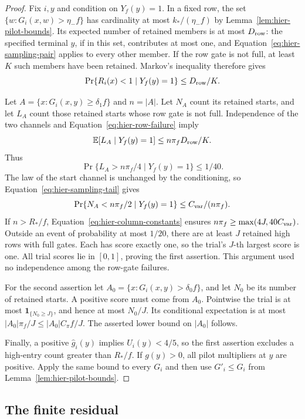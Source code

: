 \begin{proof}
Fix $i,y$ and condition on $Y_f(y)=1$.  In a fixed row, the set
$\{w:G_i(x,w)>\eta_-f\}$ has cardinality at most
$k_*/(\eta_-f)$ by Lemma~\ref{lem:hier-pilot-bounds}.
Its expected number of retained members is at most $D_{\rm row}$:
the specified terminal $y$, if in this set, contributes at most one,
and Equation~\eqref{eq:hier-sampling-pair} applies to every other member.
If the row gate is not full, at least $K$ such members have been retained.
Markov's inequality therefore gives
\begin{equation}
 \Pr\{R_i(x)<1\mid Y_f(y)=1\}\leq D_{\rm row}/K.
 \label{eq:hier-row-failure}
\end{equation}

Let $A=\{x:G_i(x,y)\geq\delta_1f\}$ and $n=|A|$.
Let $N_A$ count its retained starts, and let $L_A$ count those retained
starts whose row gate is not full.  Independence of the two channels
and Equation~\eqref{eq:hier-row-failure} imply
\[
 \mathbb E[L_A\mid Y_f(y)=1]\leq n\pi_fD_{\rm row}/K.
\]
Thus
\[
 \Pr\{L_A>n\pi_f/4\mid Y_f(y)=1\}\leq1/40.
\]
The law of the start channel is unchanged by the conditioning, so
Equation~\eqref{eq:hier-sampling-tail} gives
\[
 \Pr\{N_A<n\pi_f/2\mid Y_f(y)=1\}
       \leq C_{\rm var}/(n\pi_f).
\]
If $n>R_*/f$, Equation~\eqref{eq:hier-column-constants} ensures
$n\pi_f\geq\max(4J,40C_{\rm var})$.  Outside an event of probability
at most $1/20$, there are at least $J$ retained high rows with full
gates.  Each has score exactly one, so the trial's $J$-th largest score
is one.  All trial scores lie in $[0,1]$, proving the first assertion.
This argument used no independence among the row-gate failures.

For the second assertion let
$A_0=\{x:G_i(x,y)>\delta_0f\}$, and let $N_0$ be its number of
retained starts.  A positive score must come from $A_0$.  Pointwise the
trial is at most $\mathbf 1_{\{N_0\geq J\}}$, and hence at most
$N_0/J$.  Its conditional expectation is at most
$|A_0|\pi_f/J\leq |A_0|C_\pi f/J$.  The asserted lower bound on
$|A_0|$ follows.

Finally, a positive $\widehat g_i(y)$ implies $U_i(y)<4/5$, so the
first assertion excludes a high-entry count greater than $R_*/f$.
If $g(y)>0$, all pilot multipliers at $y$ are positive.  Apply the
same bound to every $G_i$ and then use $G'_i\leq G_i$ from
Lemma~\ref{lem:hier-pilot-bounds}.
\end{proof}

\subsection{The finite residual}


